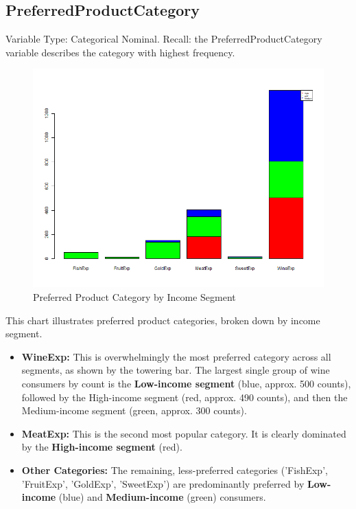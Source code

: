 \subsection{PreferredProductCategory}
Variable Type: Categorical Nominal. 
Recall: the PreferredProductCategory variable describes the category with highest frequency.
\begin{figure}[H]
    \centering
    \includegraphics[width= 1\linewidth]{Imatges/stacked_barplot_counts_IncomeSegment_10_legend(category).png}
    \caption{Preferred Product Category by Income Segment}
    \label{fig:scree_plot_11} %
\end{figure}

This chart illustrates preferred product categories, broken down by income segment. 
\begin{itemize}
    \item \textbf{WineExp:} This is overwhelmingly the most preferred category across all segments, as shown by the towering bar. The largest single group of wine consumers by count is the \textbf{Low-income segment} (blue, approx. 500 counts), followed by the High-income segment (red, approx. 490 counts), and then the Medium-income segment (green, approx. 300 counts).
    \item \textbf{MeatExp:} This is the second most popular category. It is clearly dominated by the \textbf{High-income segment} (red).
    \item \textbf{Other Categories:} The remaining, less-preferred categories ('FishExp', 'FruitExp', 'GoldExp', 'SweetExp') are predominantly preferred by \textbf{Low-income} (blue) and \textbf{Medium-income} (green) consumers.
\end{itemize}
